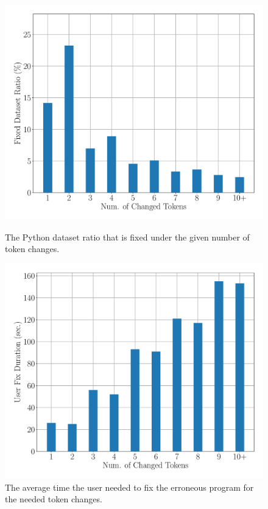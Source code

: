 \begin{figure}[t]
  \centering
  \begin{minipage}[c]{0.46\linewidth}
    \centering
    \includegraphics[width=\linewidth]{dataset-ratio-per-change.pdf}
    \caption{The Python dataset ratio that is fixed under the given number of
     token changes.}
    \label{fig:token-changes-ratio}
  \end{minipage}
  \hspace{0.06\linewidth}
  \begin{minipage}[c]{0.46\linewidth}
      \centering
      \includegraphics[width=\linewidth]{median-repair-times.pdf}
      \caption{The average time the user needed to fix the erroneous program
      for the needed token changes.}
      \label{fig:token-changes}
  \end{minipage}
\end{figure}


